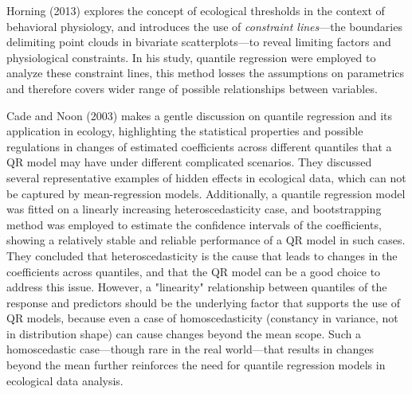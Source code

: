 Horning (2013)\cite{Horning2012} explores the concept of ecological thresholds in the context of behavioral physiology,
and introduces the use of \textit{constraint lines}—the boundaries delimiting point
clouds in bivariate scatterplots—to reveal limiting factors and physiological constraints.
In his study, quantile regression were employed to analyze these constraint lines, this method losses the assumptions on parametrics
and therefore covers wider range of possible relationships between variables.

Cade and Noon (2003)\cite{Cade2003} makes a gentle discussion on quantile regression and its application in ecology,
highlighting the statistical properties and possible regulations in changes of estimated coefficients across 
different quantiles that a QR model may have under different complicated scenarios.
They discussed several representative examples of hidden effects in ecological data, which can not be captured by 
mean-regression models. Additionally, a quantile regression model was fitted on a linearly increasing heteroscedasticity case, 
and bootstrapping method was employed to estimate the confidence intervals of the coefficients, showing 
a relatively stable and reliable performance of a QR model in such cases.
They concluded that heteroscedasticity is the cause that leads to changes in the coefficients across quantiles,
and that the QR model can be a good choice to address this issue.
However, a "linearity" relationship between quantiles of the response and predictors should be the underlying factor 
that supports the use of QR models, because even a case of homoscedasticity (constancy in variance, not in distribution shape) 
can cause changes beyond the mean scope. 
Such a homoscedastic case—though rare in the real world—that results in changes beyond the mean further reinforces 
the need for quantile regression models in ecological data analysis.


